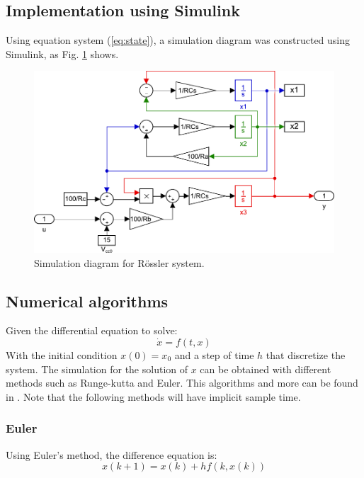 \subsection{Implementation using Simulink}
Using equation system (\ref{eq:state}), a simulation diagram was constructed using Simulink, as Fig. \ref{fig:simulink}
shows.
\begin{figure}[H]
    \centering
    \includegraphics[scale=0.55]{figs/simulink.pdf}
    \caption{Simulation diagram for R\"ossler system.}
    \label{fig:simulink}
\end{figure}

\subsection{Numerical algorithms}
	Given the differential equation to solve:
    \begin{equation}
        \dot{x} = f\left(t,x\right)
    \end{equation}
    With the initial condition $x\left(0\right)=x_0$ and a step of time $h$ that discretize the system. The simulation for the solution of $x$ can be obtained with different methods such as Runge-kutta and Euler. This algorithms and more can be found in \cite{kutta}. Note that the following methods will have implicit sample time.
    
    \subsubsection{Euler}
    Using Euler's method, the difference equation is:
    \begin{equation}
        x\left(k+1\right) = x\left(k\right) + hf\left(k,x\left(k\right)\right)
    \end{equation}
    
